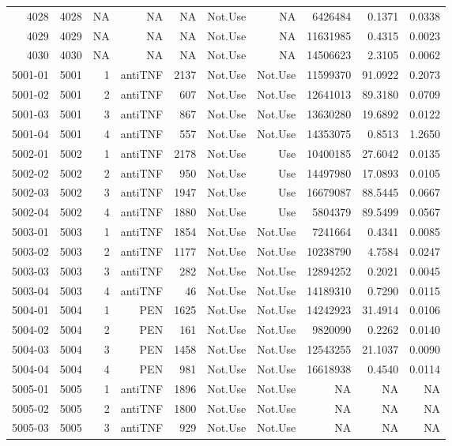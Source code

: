 {\begin{longtable}{ | r | r | r | r | r | r | r | r | r | r | }
4028 & 4028 & NA & NA & NA & Not.Use & NA & 6426484 & 0.1371 & 0.0338\\ 
4029 & 4029 & NA & NA & NA & Not.Use & NA & 11631985 & 0.4315 & 0.0023\\ 
4030 & 4030 & NA & NA & NA & Not.Use & NA & 14506623 & 2.3105 & 0.0062\\ 
5001-01 & 5001 & 1 & antiTNF & 2137 & Not.Use & Not.Use & 11599370 & 91.0922 & 0.2073\\ 
5001-02 & 5001 & 2 & antiTNF & 607 & Not.Use & Not.Use & 12641013 & 89.3180 & 0.0709\\ 
5001-03 & 5001 & 3 & antiTNF & 867 & Not.Use & Not.Use & 13630280 & 19.6892 & 0.0122\\ 
5001-04 & 5001 & 4 & antiTNF & 557 & Not.Use & Not.Use & 14353075 & 0.8513 & 1.2650\\ 
5002-01 & 5002 & 1 & antiTNF & 2178 & Not.Use & Use & 10400185 & 27.6042 & 0.0135\\ 
5002-02 & 5002 & 2 & antiTNF & 950 & Not.Use & Use & 14497980 & 17.0893 & 0.0105\\ 
5002-03 & 5002 & 3 & antiTNF & 1947 & Not.Use & Use & 16679087 & 88.5445 & 0.0667\\ 
5002-04 & 5002 & 4 & antiTNF & 1880 & Not.Use & Use & 5804379 & 89.5499 & 0.0567\\ 
5003-01 & 5003 & 1 & antiTNF & 1854 & Not.Use & Not.Use & 7241664 & 0.4341 & 0.0085\\ 
5003-02 & 5003 & 2 & antiTNF & 1177 & Not.Use & Not.Use & 10238790 & 4.7584 & 0.0247\\ 
5003-03 & 5003 & 3 & antiTNF & 282 & Not.Use & Not.Use & 12894252 & 0.2021 & 0.0045\\ 
5003-04 & 5003 & 4 & antiTNF & 46 & Not.Use & Not.Use & 14189310 & 0.7290 & 0.0115\\ 
5004-01 & 5004 & 1 & PEN & 1625 & Not.Use & Not.Use & 14242923 & 31.4914 & 0.0106\\ 
5004-02 & 5004 & 2 & PEN & 161 & Not.Use & Not.Use & 9820090 & 0.2262 & 0.0140\\ 
5004-03 & 5004 & 3 & PEN & 1458 & Not.Use & Not.Use & 12543255 & 21.1037 & 0.0090\\ 
5004-04 & 5004 & 4 & PEN & 981 & Not.Use & Not.Use & 16618938 & 0.4540 & 0.0114\\ 
5005-01 & 5005 & 1 & antiTNF & 1896 & Not.Use & Not.Use & NA & NA & NA\\ 
5005-02 & 5005 & 2 & antiTNF & 1800 & Not.Use & Not.Use & NA & NA & NA\\ 
5005-03 & 5005 & 3 & antiTNF & 929 & Not.Use & Not.Use & NA & NA & NA\\ 

\end{longtable}}
